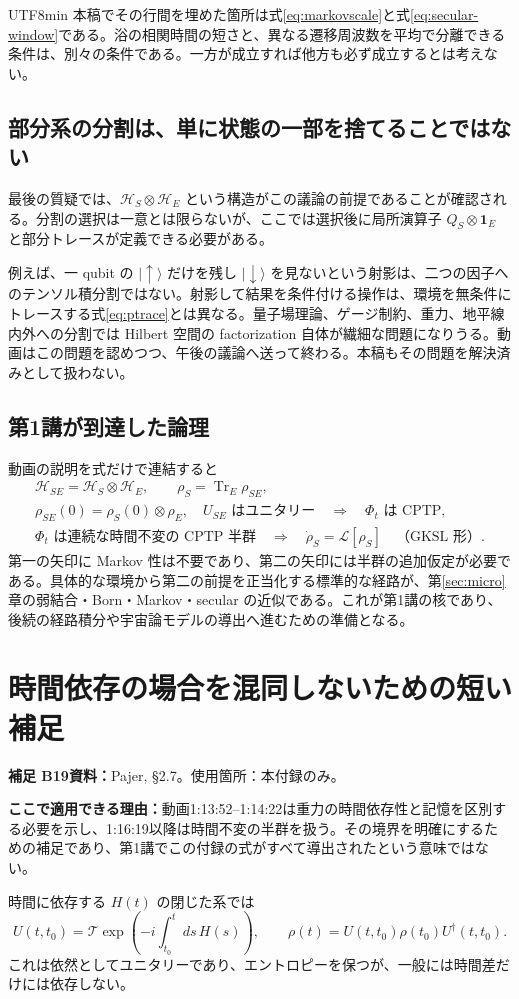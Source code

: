 \documentclass[11pt,a4paper]{article}
\numberwithin{equation}{section}
\newcommand{\Tr}{\operatorname{Tr}}
\newcommand{\I}{\mathbf{1}}
\newcommand{\ket}[1]{\lvert#1\rangle}
\newcommand{\supp}[3]{\par\smallskip\noindent\textcolor{BrickRed}{\textbf{補足 #1}}\quad\textbf{資料：}#2\par\noindent\textbf{ここで適用できる理由：}#3\par}
\begin{document}
\begin{CJK*}{UTF8}{min}
本稿でその行間を埋めた箇所は式\eqref{eq:markovscale}と式\eqref{eq:secular-window}である。浴の相関時間の短さと、異なる遷移周波数を平均で分離できる条件は、別々の条件である。一方が成立すれば他方も必ず成立するとは考えない。

\subsection{部分系の分割は、単に状態の一部を捨てることではない}
最後の質疑では、$\mathcal H_S\otimes\mathcal H_E$ という構造がこの議論の前提であることが確認される。分割の選択は一意とは限らないが、ここでは選択後に局所演算子 $Q_S\otimes\I_E$ と部分トレースが定義できる必要がある。

例えば、一 qubit の $\ket{\uparrow}$ だけを残し $\ket{\downarrow}$ を見ないという射影は、二つの因子へのテンソル積分割ではない。射影して結果を条件付ける操作は、環境を無条件にトレースする式\eqref{eq:ptrace}とは異なる。量子場理論、ゲージ制約、重力、地平線内外への分割では Hilbert 空間の factorization 自体が繊細な問題になりうる。動画はこの問題を認めつつ、午後の議論へ送って終わる。本稿もその問題を解決済みとして扱わない。

\subsection{第1講が到達した論理}
動画の説明を式だけで連結すると
\begin{equation}
\begin{gathered}
\mathcal H_{SE}=\mathcal H_S\otimes\mathcal H_E,
\qquad\rho_S=\Tr_E\rho_{SE},\\
\rho_{SE}(0)=\rho_S(0)\otimes\rho_E,
\quad U_{SE}\text{ はユニタリー}
\quad\Longrightarrow\quad\Phi_t\text{ は CPTP},\\
\Phi_t\text{ は連続な時間不変の CPTP 半群}
\quad\Longrightarrow\quad\dot\rho_S=\mathcal L[\rho_S]
\quad\text{（GKSL 形）}.
\end{gathered}
\label{eq:logic}
\end{equation}
第一の矢印に Markov 性は不要であり、第二の矢印には半群の追加仮定が必要である。具体的な環境から第二の前提を正当化する標準的な経路が、第\ref{sec:micro}章の弱結合・Born・Markov・secular の近似である。これが第1講の核であり、後続の経路積分や宇宙論モデルの導出へ進むための準備となる。

\appendix
\section{時間依存の場合を混同しないための短い補足}
\label{app:time-dependent}
\supp{B19}{Pajer\cite{pajer}, §2.7。使用箇所：本付録のみ。}{動画1:13:52--1:14:22は重力の時間依存性と記憶を区別する必要を示し、1:16:19以降は時間不変の半群を扱う。その境界を明確にするための補足であり、第1講でこの付録の式がすべて導出されたという意味ではない。}
時間に依存する $H(t)$ の閉じた系では
\begin{equation}
U(t,t_0)=\mathcal T\exp\!\left(-i\int_{t_0}^{t}ds\,H(s)\right),
\qquad\rho(t)=U(t,t_0)\rho(t_0)U^\dagger(t,t_0).
\end{equation}
これは依然としてユニタリーであり、エントロピーを保つが、一般には時間差だけには依存しない。


\end{CJK*}
\end{document}

